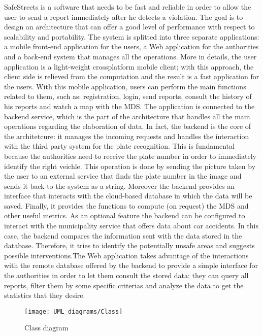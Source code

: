 SafeStreets is a software that needs to be fast and reliable in order to allow the user to send a report immediately after he detects a violation. The goal is to design an architecture that can offer a good level of performance with respect to scalability and portability. The system is splitted into three separate applications: a mobile front-end application for the users, a Web application for the authorities and a back-end system that manages all the operations. More in details, the user application is a light-weight crossplatform mobile client; with this approach, the client side is relieved from the computation and the result is a fast application for the users. With this mobile application, users can perform the main functions related to them, such as: registration, login, send reports, consult the history of his reports and watch a map with the MDS. The application is connected to the backend service, which is the part of the architecture that handles all the main operations regarding the elaboration of data. In fact, the backend is the core of the architetcure: it manages the incoming requests and handles the interaction with the third party system for the plate recognition. This is fundamental because the authorities need to receive the plate number in order to immediately identify the right veichle. This operation is done by sending the picture taken by the user to an external service that finds the plate number in the image and sends it back to the system as a string. Moreover the backend provides an interface that interacts with the cloud-based database in which the data will be saved. Finally, it provides the functions to compute (on request) the MDS and other useful metrics. As an optional feature the backend can be configured to interact with the municipality service that offers data about car accidents. In this case, the backend compares the information sent with the data stored in the database. Therefore, it tries to identify the potentially unsafe areas and suggests possible interventions.\newline The Web application takes advantage of the interactions with the remote database offered by the backend to provide a simple interface for the authorities in order to let them consult the stored data: they can query all reports, filter them by some specific criterias and analyze the data to get the statistics that they desire.
\begin{figure}[H]
    \centering
    \texttt{[image: UML\_diagrams/Class]}
    \caption{Class diagram}
    \label{fig:class_diagram}
\end{figure}
\newpage